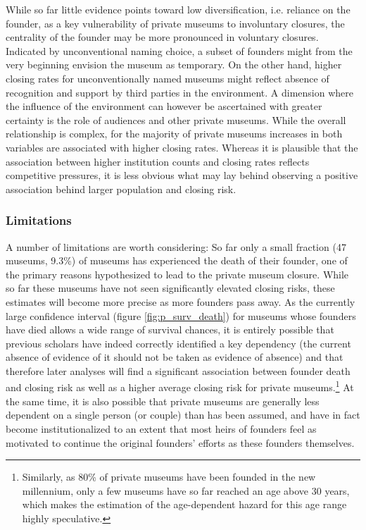 \documentclass[12pt]{article}
\begin{document}
While so far little evidence points toward low diversification, i.e. reliance on the founder, as a key vulnerability of private museums to involuntary closures, the centrality of the founder may be more pronounced in voluntary closures. 
Indicated by unconventional naming choice, a subset of founders might from the very beginning envision the museum as temporary.
On the other hand, higher closing rates for unconventionally named museums might reflect absence of recognition and support by third parties in the environment.
A dimension where the influence of the environment can however be ascertained with greater certainty is the role of audiences and other private museums.
While the overall relationship is complex, for the majority of private museums increases in both variables are associated with higher closing rates.
Whereas it is plausible that the association between higher institution counts and closing rates reflects competitive pressures, it is less obvious what may lay behind observing a positive association behind larger population and closing risk. 
\subsubsection*{Limitations}





A number of limitations are worth considering:
So far only a small fraction (47 museums, 9.3\%) of museums has experienced the death of their founder, one of the primary reasons hypothesized to lead to the private museum closure. 
While so far these museums have not seen significantly elevated closing risks, these estimates will become more precise as more founders pass away.
As the currently large confidence interval (figure \ref{fig:p_surv_death}) for museums whose founders have died allows a wide range of survival chances, it is entirely possible that previous scholars have indeed correctly identified a key dependency (the current absence of evidence of it should not be taken as evidence of absence) and that therefore later analyses will find a significant association between founder death and closing risk as well as a higher average closing risk for private museums.\footnote{Similarly, as 80\% of private museums have been founded in the new millennium, only a few museums have so far reached an age above 30 years, which makes the estimation of the age-dependent hazard for this age range highly speculative.}
At the same time, it is also possible that private museums are generally less dependent on a single person (or couple) than has been assumed, and have in fact become institutionalized to an extent that most heirs of founders feel as motivated to continue the original founders' efforts as these founders themselves.
\end{document}
